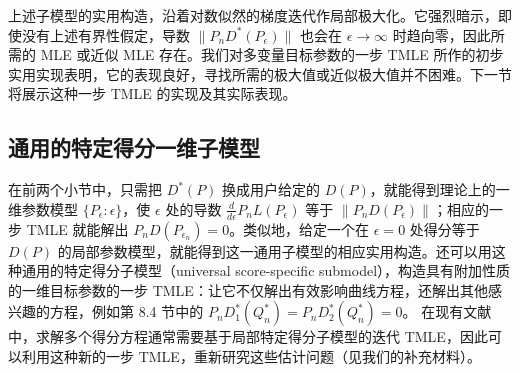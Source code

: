 上述子模型的实用构造，沿着对数似然的梯度迭代作局部极大化。它强烈暗示，即使没有上述有界性假定，导数 $\|P_nD^*(P_\epsilon)\|$ 也会在 $\epsilon\to\infty$ 时趋向零，因此所需的 MLE 或近似 MLE 存在。我们对多变量目标参数的一步 TMLE 所作的初步实用实现表明，它的表现良好，寻找所需的极大值或近似极大值并不困难。下一节将展示这种一步 TMLE 的实现及其实际表现。

\subsection{通用的特定得分一维子模型}

在前两个小节中，只需把 $D^*(P)$ 换成用户给定的 $D(P)$，就能得到理论上的一维参数模型 $\{P_\epsilon:\epsilon\}$，使 $\epsilon$ 处的导数 $\frac{d}{d\epsilon}P_nL(P_\epsilon)$ 等于 $\|P_nD(P_\epsilon)\|$；相应的一步 TMLE 就能解出 $P_nD(P_{\epsilon_n})=0$。类似地，给定一个在 $\epsilon=0$ 处得分等于 $D(P)$ 的局部参数模型，就能得到这一通用子模型的相应实用构造。还可以用这种通用的特定得分子模型（universal score-specific submodel），构造具有附加性质的一维目标参数的一步 TMLE：让它不仅解出有效影响曲线方程，还解出其他感兴趣的方程，例如第 8.4 节中的
$P_nD_1^*(Q_n^*)=P_nD_2^*(Q_n^*)=0$。
在现有文献中，求解多个得分方程通常需要基于局部特定得分子模型的迭代 TMLE，因此可以利用这种新的一步 TMLE，重新研究这些估计问题（见我们的补充材料）。
